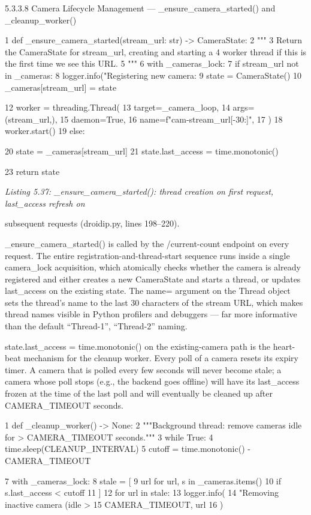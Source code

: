 5.3.3.8 Camera Lifecycle Management --- \_ensure\_camera\_started() and \_cleanup\_worker()

1 def \_ensure\_camera\_started(stream\_url: str) -> CameraState:
2 """
3 Return the CameraState for stream\_url, creating and starting a
4 worker thread if this is the first time we see this URL.
5 """
6 with \_cameras\_lock:
7 if stream\_url not in \_cameras:
8 logger.info("Registering new camera: %
9 state = CameraState()
10 \_cameras[stream\_url] = state

12 worker = threading.Thread(
13 target=\_camera\_loop,
14 args=(stream\_url,),
15 daemon=True,
16 name=f"cam-{stream\_url[-30:]}",
17 )
18 worker.start()
19 else:




20 state = \_cameras[stream\_url]
21 state.last\_access = time.monotonic()


23 return state


\textit{Listing 5.37: \_ensure\_camera\_started(): thread creation on ﬁrst request, last\_access refresh on}

subsequent requests (droidip.py, lines 198--220).


\_ensure\_camera\_started() is called by the /current-count endpoint on every
request. The entire registration-and-thread-start sequence runs inside a single camera\_lock
acquisition, which atomically checks whether the camera is already registered and either
creates a new CameraState and starts a thread, or updates last\_access on the existing
state. The name= argument on the Thread object sets the thread's name to the last 30
characters of the stream URL, which makes thread names visible in Python proﬁlers and
debuggers --- far more informative than the default ``Thread-1'', ``Thread-2'' naming.

state.last\_access = time.monotonic() on the existing-camera path is the heart-
beat mechanism for the cleanup worker. Every poll of a camera resets its expiry timer. A
camera that is polled every few seconds will never become stale; a camera whose poll stops
(e.g., the backend goes ofﬂine) will have its last\_access frozen at the time of the last poll
and will eventually be cleaned up after CAMERA\_TIMEOUT seconds.

1 def \_cleanup\_worker() -> None:
2 """Background thread: remove cameras idle for > CAMERA\_TIMEOUT seconds."""
3 while True:
4 time.sleep(CLEANUP\_INTERVAL)
5 cutoff = time.monotonic() - CAMERA\_TIMEOUT

7 with \_cameras\_lock:
8 stale = [
9 url for url, s in \_cameras.items()
10 if s.last\_access < cutoff
11 ]
12 for url in stale:
13 logger.info(
14 "Removing inactive camera (idle > %
15 CAMERA\_TIMEOUT, url
16 )




